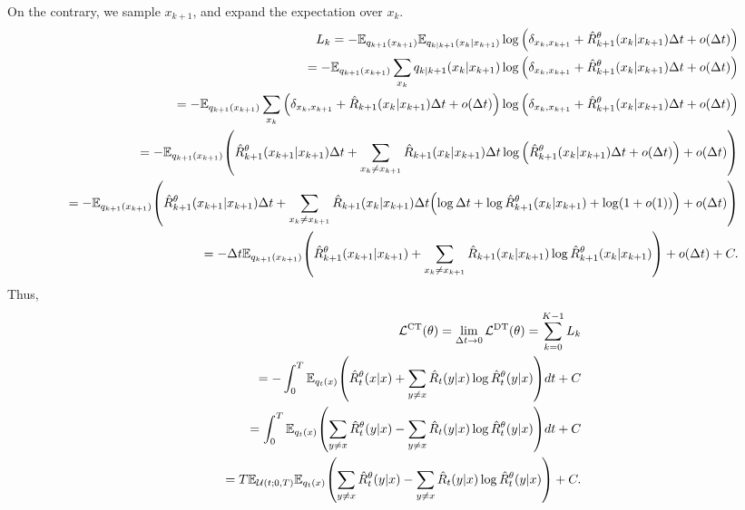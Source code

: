 \documentclass[10pt]{article}
\begin{document}
On the contrary, we sample $x_{k+1}$, and expand the expectation over $x_k$.
\begin{eqnarray*}
  &&L_k = - \mathbb{E}_{q_{k+1}(x_{k+1})}\mathbb{E}_{q_{k|k+1}\qty(x_k|x_{k+1})}\log \qty(\delta_{x_k,x_{k+1}} + \hat{R}_{k+1}^\theta\qty(x_k|x_{k+1})\Delta t + o(\Delta t)) \\
  &&= - \mathbb{E}_{q_{k+1}(x_{k+1})}\sum_{x_k}q_{k|k+1}\qty(x_k|x_{k+1})\log \qty(\delta_{x_k,x_{k+1}} + \hat{R}_{k+1}^\theta\qty(x_k|x_{k+1})\Delta t + o(\Delta t)) \\
  &&= - \mathbb{E}_{q_{k+1}(x_{k+1})}\sum_{x_k}\qty(\delta_{x_k,x_{k+1}} + \hat{R}_{k+1}\qty(x_k|x_{k+1})\Delta t + o(\Delta t))\log \qty(\delta_{x_k,x_{k+1}} + \hat{R}_{k+1}^\theta\qty(x_k|x_{k+1})\Delta t + o(\Delta t)) \\
  &&= - \mathbb{E}_{q_{k+1}(x_{k+1})}\qty(\hat{R}_{k+1}^\theta\qty(x_{k+1}|x_{k+1})\Delta t + \sum_{x_k\neq x_{k+1}}\hat{R}_{k+1}\qty(x_k|x_{k+1})\Delta t \log \qty(\hat{R}_{k+1}^\theta\qty(x_k|x_{k+1})\Delta t + o(\Delta t)) + o(\Delta t)) \\
  &&= -\mathbb{E}_{q_{k+1}(x_{k+1})}\qty(\hat{R}_{k+1}^\theta\qty(x_{k+1}|x_{k+1})\Delta t + \sum_{x_k\neq x_{k+1}}\hat{R}_{k+1}\qty(x_k|x_{k+1})\Delta t \qty(\log\Delta t + \log \hat{R}_{k+1}^\theta\qty(x_k|x_{k+1}) + \log(1 + o(1))) + o(\Delta t)) \\
  &&= -\Delta t\mathbb{E}_{q_{k+1}(x_{k+1})}\qty(\hat{R}_{k+1}^\theta\qty(x_{k+1}|x_{k+1}) + \sum_{x_k\neq x_{k+1}}\hat{R}_{k+1}\qty(x_k|x_{k+1}) \log \hat{R}_{k+1}^\theta\qty(x_k|x_{k+1})) + o(\Delta t) + C.
\end{eqnarray*}
Thus,
\begin{eqnarray*}
  &&\mathcal{L}^\text{CT}(\theta) = \lim_{\Delta t\to 0}\mathcal{L}^\text{DT}(\theta) = \sum_{k=0}^{K-1}L_k \\
  &&= - \int_0^T \mathbb{E}_{q_t(x)}\qty(\hat{R}_t^\theta(x|x) + \sum_{y\neq x}\hat{R}_t(y|x)\log\hat{R}_t^\theta(y|x))dt + C\\
  &&=\int_0^T \mathbb{E}_{q_t(x)}\qty(\sum_{y\neq x}\hat{R}_t^\theta(y|x) - \sum_{y\neq x}\hat{R}_t(y|x)\log\hat{R}_t^\theta(y|x))dt + C\\
  &&=T\mathbb{E}_{\mathcal{U}(t;0,T)}\mathbb{E}_{q_t(x)}\qty(\sum_{y\neq x}\hat{R}_t^\theta(y|x) - \sum_{y\neq x}\hat{R}_t(y|x)\log\hat{R}_t^\theta(y|x)) + C.
\end{eqnarray*}





\end{document}
